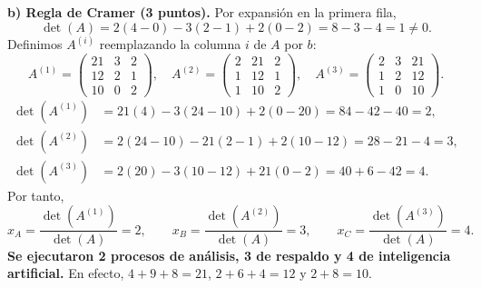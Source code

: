 \documentclass[10pt,a4]{examenEPN0}
\begin{document}
\noindent\textbf{b) Regla de Cramer (3 puntos).}
Por expansión en la primera fila,
\[
    \det(A)=2(4-0)-3(2-1)+2(0-2)=8-3-4=1\ne0.
\]
Definimos $A^{(i)}$ reemplazando la columna $i$ de $A$ por $b$:
\[
    A^{(1)}=\begin{pmatrix}21&3&2\\12&2&1\\10&0&2\end{pmatrix},\quad
    A^{(2)}=\begin{pmatrix}2&21&2\\1&12&1\\1&10&2\end{pmatrix},\quad
    A^{(3)}=\begin{pmatrix}2&3&21\\1&2&12\\1&0&10\end{pmatrix}.
\]
\begin{align*}
    \det(A^{(1)})&=21(4)-3(24-10)+2(0-20)=84-42-40=2,\\
    \det(A^{(2)})&=2(24-10)-21(2-1)+2(10-12)=28-21-4=3,\\
    \det(A^{(3)})&=2(20)-3(10-12)+21(0-2)=40+6-42=4.
\end{align*}
Por tanto,
\[
    x_A=\frac{\det(A^{(1)})}{\det(A)}=2,\qquad
    x_B=\frac{\det(A^{(2)})}{\det(A)}=3,\qquad
    x_C=\frac{\det(A^{(3)})}{\det(A)}=4.
\]
\textbf{Se ejecutaron 2 procesos de análisis, 3 de respaldo y 4 de inteligencia artificial.}
En efecto, $4+9+8=21$, $2+6+4=12$ y $2+8=10$.
\end{document}
